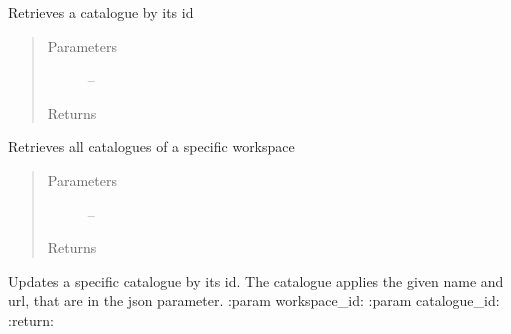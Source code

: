 \documentclass[letterpaper,10pt,english]{sphinxmanual}
\begin{document}
\begin{fulllineitems}
\label{_source/son_editor.impl:son_editor.impl.cataloguesimpl.get_catalogue}
Retrieves a catalogue by its id
\begin{quote}\begin{description}
\item[{Parameters}] \leavevmode
{} -- 

\item[{Returns}] \leavevmode


\end{description}\end{quote}

\end{fulllineitems}


\begin{fulllineitems}
\label{_source/son_editor.impl:son_editor.impl.cataloguesimpl.get_catalogues}
Retrieves all catalogues of a specific workspace
\begin{quote}\begin{description}
\item[{Parameters}] \leavevmode
{} -- 

\item[{Returns}] \leavevmode


\end{description}\end{quote}

\end{fulllineitems}


\begin{fulllineitems}
\label{_source/son_editor.impl:son_editor.impl.cataloguesimpl.update_catalogue}
Updates a specific catalogue by its id. The catalogue
applies the given name and url, that are in the json parameter.
:param workspace\_id:
:param catalogue\_id:
:return:

\end{fulllineitems}
\end{document}
